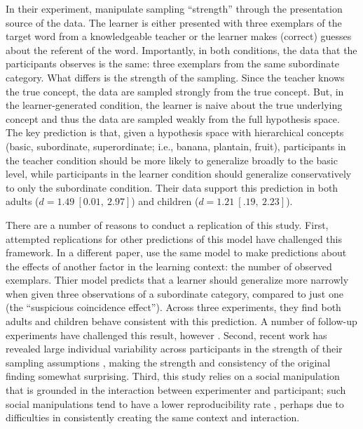 \documentclass[man]{apa2}
\begin{document}
In their experiment,  manipulate sampling ``strength'' through the presentation source of the data. The learner is either presented with three exemplars of the target word from a knowledgeable teacher or the learner makes (correct) guesses about the referent of the word. Importantly, in both conditions, the data that the participants observes is the same: three exemplars from the same subordinate category. What differs is the strength of the sampling. Since the teacher knows the true concept, the data are sampled strongly from the true concept. But, in the learner-generated condition, the learner is naive about the true underlying concept and thus the data are sampled weakly from the full hypothesis space. The key prediction is that, given a hypothesis space with hierarchical concepts (basic, subordinate, superordinate; i.e., banana, plantain, fruit), participants in the teacher condition should be more likely to generalize broadly to the basic level, while participants in the learner condition should generalize conservatively to only the subordinate condition. Their data support  this prediction in both adults ($d = 1.49\ [0.01,\ 2.97]$) and children ($d = 1.21\ [.19,\ 2.23]$).

There are a number of reasons to conduct a replication of this study. First, attempted replications for other predictions of this model have challenged this framework. In a different paper,  use the same model to make predictions about the effects of another factor in the learning context: the number of observed exemplars. Thier model predicts that a learner should generalize more narrowly when given three observations of a subordinate category, compared to just one (the ``suspicious coincidence effect''). Across three experiments, they find both adults and children behave consistent with this prediction. A number of follow-up experiments have challenged this result, however \cite{jenkins2015non,spencer2011}. Second, recent work has revealed large individual variability across participants in the strength of their sampling assumptions \cite{navarro2012sampling}, making the strength and consistency of the original finding somewhat surprising. Third, this study relies on a social manipulation that is grounded in the interaction between experimenter and participant; such social manipulations tend to have a lower reproducibility rate \cite{reproProj2015}, perhaps due to difficulties in consistently creating the same context and interaction.
\end{document}
